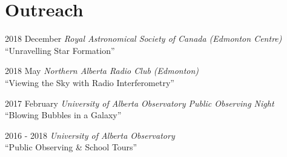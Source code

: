 \documentclass[letterpaper,11pt]{article}
\newlength{\mainindent} \setlength{\mainindent}{12pt}
\newlength{\contentindent} \setlength{\contentindent}{19ex}
\newenvironment{datelist}{
  \begingroup
  \raggedright
  \begin{description}[labelindent=\mainindent,leftmargin=\contentindent,
      style=sameline,font=\normalfont,topsep=0pt,partopsep=0pt,parsep=0pt,
      itemsep=4pt]
}{
  \end{description}
  \endgroup
}
\begin{document}

\section*{Outreach}
\begin{datelist}
\item[2018 December] \emph{Royal Astronomical Society of Canada (Edmonton Centre)} \\ ``Unravelling Star Formation''
\item[2018 May] \emph{Northern Alberta Radio Club (Edmonton)} \\ ``Viewing the Sky with Radio Interferometry''
\item[2017 February] \emph{University of Alberta Observatory Public Observing Night} \\ ``Blowing Bubbles in a Galaxy''
\item[2016 - 2018] \emph{University of Alberta Observatory} \\ ``Public Observing \& School Tours''
\end{datelist}
\end{document}
